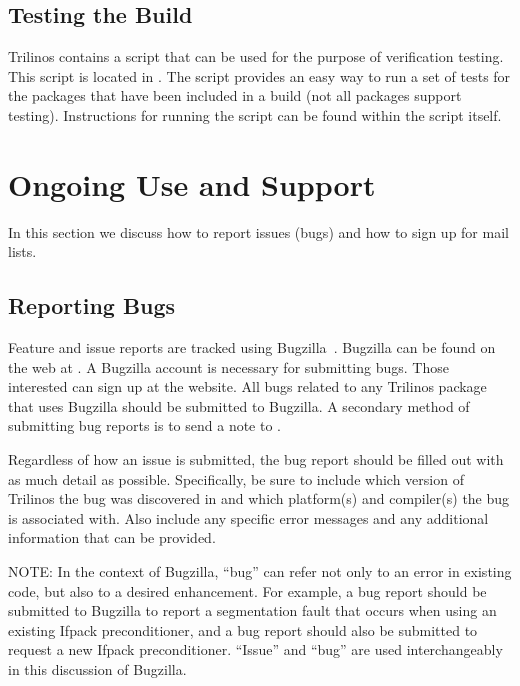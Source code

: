 \documentclass[12pt,relax]{TrilinosUserGuide}
\begin{document}



\subsection{Testing the Build}
\label{subsect:TestHarness}

Trilinos contains a script that can be used for the purpose of 
verification testing.  This script is located 
in .  The script 
provides an easy way to run a set of tests for the packages that have been 
included in a build (not all packages support testing).  
Instructions for running the script can be found within the script itself.

\section{Ongoing Use and Support}
\label{Section:UseSupport}
In this section we discuss how to report issues (bugs) and how to sign up
for mail lists.

\subsection{Reporting Bugs}
\label{subsect:Bugzilla}
Feature and issue reports are tracked using Bugzilla~\cite{Bugzilla}.  
Bugzilla can be found on the web at 
.  
A Bugzilla account is necessary for submitting bugs.  Those interested can 
sign up at the website.  All bugs related to any Trilinos package that uses 
Bugzilla should be submitted to Bugzilla.  A secondary method of submitting
bug reports is to send a note 
to .  

Regardless of how an issue is submitted, the bug report should be filled out 
with as much detail as possible.  Specifically, be sure to include which 
version of Trilinos the bug was discovered in and which 
platform(s) and compiler(s) the bug is associated with.  Also include any 
specific error messages and any additional information that can be provided.

NOTE: In the context of Bugzilla, ``bug'' can refer not only to an error in 
existing code, but also to a desired enhancement.  For example, a bug report 
should be submitted to Bugzilla to report a segmentation fault that occurs 
when using an existing Ifpack preconditioner, and a bug report should also be
submitted to request a new Ifpack preconditioner.  ``Issue'' and ``bug'' are 
used interchangeably in this discussion of Bugzilla.
\end{document}
